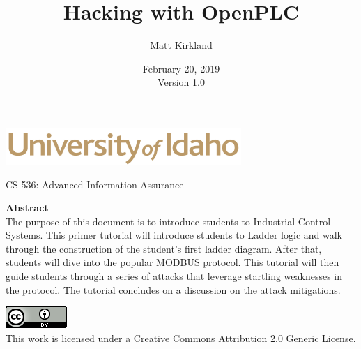 \documentclass[12pt]{extarticle}
\begin{document}
\title{Hacking with OpenPLC}
\author{Matt Kirkland}
\date{February 20, 2019 \\ \hyperref[changelog]{Version 1.0}} %
\renewcommand{\abstractname}{Summary}
\begin{titlepage}
\maketitle
{}
\begin{center}
\includegraphics[scale=.5]{UofI}

\large{CS 536: Advanced Information Assurance}

\vskip 40pt

\textbf{Abstract}\\
The purpose of this document is to introduce students to Industrial Control Systems. This primer tutorial will introduce students to Ladder logic and walk through the construction of the student's first ladder diagram. After that, students will dive into the popular MODBUS protocol. This tutorial will then guide students through a series of attacks that leverage startling weaknesses in the protocol. The tutorial concludes on a discussion on the attack mitigations.

\end{center}


\vfill
\begin{center}
\includegraphics[scale=.5]{cc}\\
This work is licensed under a \href{https://creativecommons.org/licenses/by/2.0/}{Creative Commons Attribution 2.0 Generic License}.
\vskip 10pt
\end{center}

\end{titlepage}


\pagebreak
\tableofcontents


\pagebreak
{}
\setcounter{section}{1}
\end{document}
